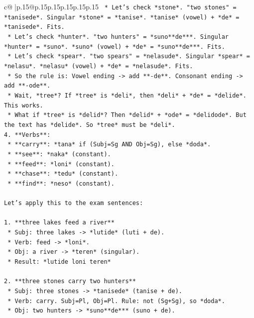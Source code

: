 \documentclass{article}
\begin{document}
{\begin{supertabular}{c@{$\;$}|p{.15\linewidth}@{}p{.15\linewidth}p{.15\linewidth}p{.15\linewidth}p{.15\linewidth}p{.15\linewidth}}
{{{\texttt{        *   Let's check *stone*. "two stones" = *tanisede*. Singular *stone* = *tanise*. *tanise* (vowel) + *de* = *tanisede*. Fits.} \\
\texttt{        *   Let's check *hunter*. "two hunters" = *suno**de***. Singular *hunter* = *suno*. *suno* (vowel) + *de* = *suno**de***. Fits.} \\
\texttt{        *   Let's check *spear*. "two spears" = *nelasude*. Singular *spear* = *nelasu*. *nelasu* (vowel) + *de* = *nelasude*. Fits.} \\
\texttt{        *   So the rule is: Vowel ending {-}> add **{-}de**. Consonant ending {-}> add **{-}ode**.} \\
\texttt{        *   Wait, *tree*? If *tree* is *deli*, then *deli* + *de* = *delide*. This works.} \\
\texttt{        *   What if *tree* is *delid*? Then *delid* + *ode* = *delidode*. But the text has *delide*. So *tree* must be *deli*.} \\
\texttt{4.  **Verbs**:} \\
\texttt{    *   **carry**: *tana* if (Subj=Sg AND Obj=Sg), else *doda*.} \\
\texttt{    *   **see**: *naka* (constant).} \\
\texttt{    *   **feed**: *loni* (constant).} \\
\texttt{    *   **chase**: *tedu* (constant).} \\
\texttt{    *   **find**: *neso* (constant).} \\
\\ 
\texttt{Let's apply this to the exam sentences:} \\
\\ 
\texttt{1.  **three lakes feed a river**} \\
\texttt{    *   Subj: three lakes {-}> *lutide* (luti + de).} \\
\texttt{    *   Verb: feed {-}> *loni*.} \\
\texttt{    *   Obj: a river {-}> *teren* (singular).} \\
\texttt{    *   Result: *lutide loni teren*} \\
\\ 
\texttt{2.  **three stones carry two hunters**} \\
\texttt{    *   Subj: three stones {-}> *tanisede* (tanise + de).} \\
\texttt{    *   Verb: carry. Subj=Pl, Obj=Pl. Rule: not (Sg+Sg), so *doda*.} \\
\texttt{    *   Obj: two hunters {-}> *suno**de*** (suno + de).} \\
}}}
\end{supertabular}}
\end{document}
